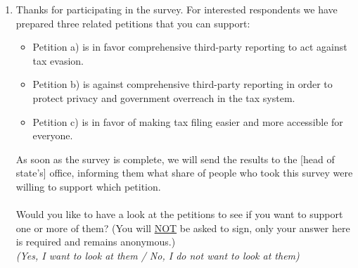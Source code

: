 \documentclass[11pt]{article}
\begin{document}
\begin{enumerate}[resume]
    \item Thanks for participating in the survey. For interested respondents we have prepared three related petitions that you can support: 
    \begin{itemize}
        \item Petition a) is in favor comprehensive third-party reporting to act against tax evasion. 
        \item Petition b) is against comprehensive third-party reporting in order to protect privacy and government overreach in the tax system. 
        \item Petition c) is in favor of making tax filing easier and more accessible for everyone. 
    \end{itemize}
    As soon as the survey is complete, we will send the results to the [head of state’s] office, informing them what share of people who took this survey were willing to support which petition. \\ \\ Would you like to have a look at the petitions to see if you want to support one or more of them? (You will \underline{NOT} be asked to sign, only your answer here is required and remains anonymous.)\\  \textit{(Yes, I want to look at them / No, I do not want to look at them)} 
     

\end{enumerate}
\end{document}
